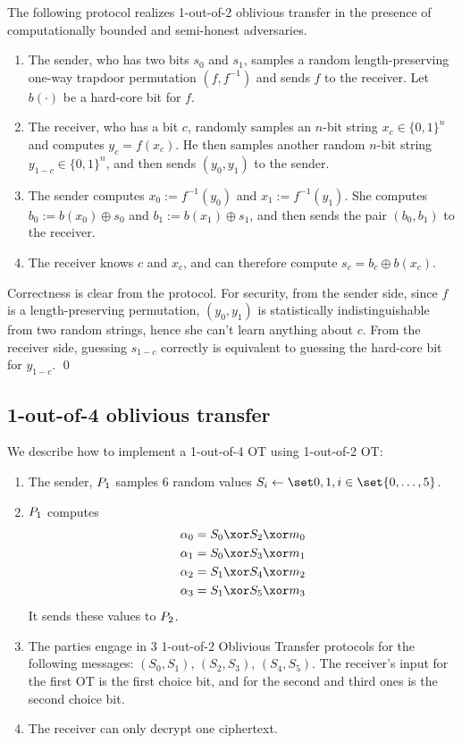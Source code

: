 \begin{theorem}
The following protocol realizes 1-out-of-2 oblivious transfer in the presence of computationally bounded and semi-honest adversaries. 
\begin{enumerate}
\item The sender, who has two bits $s_0$ and $s_1$, samples a random length-preserving one-way trapdoor permutation $(f, f^{-1})$ and sends $f$ to the receiver.  Let $b(\cdot)$ be a hard-core bit for $f$.
\item The receiver, who has a bit $c$, randomly samples an $n$-bit string $x_c \in \{0,1\}^n$ and computes $y_c = f(x_c)$. He then samples another random $n$-bit string $y_{1-c} \in \{0,1\}^n$, and then sends $(y_0, y_1)$ to the sender.
\item The sender computes $x_0 := f^{-1}(y_0)$ and $x_1 := f^{-1}(y_1)$. She computes $b_0 := b(x_0) \oplus s_0$ and $b_1 := b(x_1) \oplus s_1$, and then sends the pair $(b_0, b_1)$ to the receiver.
\item The receiver knows $c$ and $x_c$, and can therefore compute $s_c = b_c \oplus b(x_c)$. 
\end{enumerate}
\end{theorem}
\proof
Correctness is clear from the protocol.	
For security, from the sender side, since $f$ is a length-preserving permutation, $(y_0, y_1)$ is statistically indistinguishable from two random strings, hence she can't learn anything about $c$.
From the receiver side, guessing $s_{1-c}$ correctly is equivalent to guessing the hard-core bit for $y_{1-c}$.
\qed


\subsection{1-out-of-4 oblivious transfer}
  We describe how to implement a 1-out-of-4 OT using 1-out-of-2 OT:\@
  \begin{enumerate}
    \item
      The sender, $P_1$ samples 6 random values $S_i \gets \bits, i \in \set{0,\dotsc, 5}$.
    \item
      $P_1$ computes
      \begin{align*}
        \alpha_0 &= S_0 \xor S_2 \xor m_0\\
        \alpha_1 &= S_0 \xor S_3 \xor m_1\\
        \alpha_2 &= S_1 \xor S_4 \xor m_2\\
        \alpha_3 &= S_1 \xor S_5 \xor m_3
      \end{align*}
      It sends these values to $P_2$.
    \item
      The parties engage in 3 1-out-of-2 Oblivious Transfer protocols for the following
      messages: $(S_0, S_1)$, $(S_2, S_3)$, $(S_4, S_5)$. The receiver's input for
      the first OT is the first choice bit, and for the second and third ones is
      the second choice bit.
    \item
      The receiver can only decrypt one ciphertext.
  \end{enumerate}


